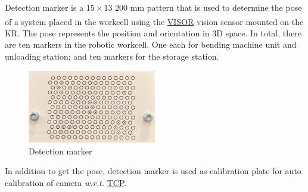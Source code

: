 Detection marker is a $15\times13$ 200 mm pattern that is used to determine the pose of a system placed in the workcell using the \hyperref[acro:VISOR]{VISOR}\textsuperscript{\textregistered} vision sensor
mounted on the KR. The pose represents the position and orientation in 3D space. In total, there are ten markers in the robotic workcell.
One each for bending machine unit and unloading station; and ten markers for the storage station.

\begin{figure}[h]
    \centering
    \includegraphics[width=0.5\textwidth]{figures/detection-marker.png}
    \caption{Detection marker}
    \label{fig:marker}
\end{figure}

In addition to get the pose, detection marker is used as calibration plate for auto calibration of camera \textit{w.r.t.} \hyperref[acro:TCP]{TCP}.
